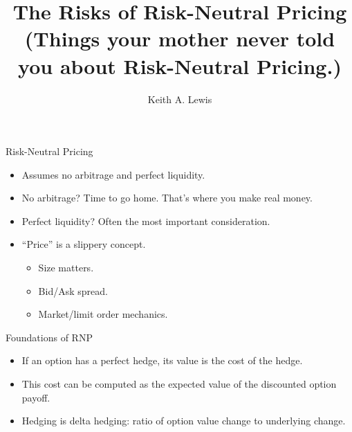 \documentclass[fleqn]{amsart}
\title{The Risks of Risk-Neutral Pricing\\
{\small (Things your mother never told you about Risk-Neutral Pricing.)}}
\author{Keith A. Lewis}
\begin{document}
\maketitle

\begin{section}{Risk-Neutral Pricing}

\begin{itemize}

\item Assumes no arbitrage and perfect liquidity.

\item No arbitrage? Time to go home. That's where you make real money.

\item Perfect liquidity? Often the most important consideration.

\item ``Price'' is a slippery concept.
\begin{itemize}
	\item Size matters.
	\item Bid/Ask spread.
	\item Market/limit order mechanics.
\end{itemize}

\end{itemize}

\end{section}

\begin{section}{Foundations of RNP}

\begin{itemize}

\item If an option has a perfect hedge, its value is the
cost of the hedge.

\item This cost can be computed as the expected value of
the discounted option payoff.

\item Hedging is delta hedging:  ratio of option value change to
underlying change.

\end{itemize}

\end{section}
\end{document}
